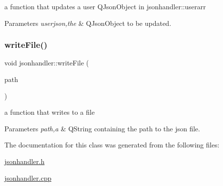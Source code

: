 a function that updates a user Q\+Json\+Object in jsonhandler\+::userarr 


\begin{DoxyParams}{Parameters}
{\em userjson,the} & Q\+Json\+Object to be updated. \\
\hline
\end{DoxyParams}
\mbox{\label{classjsonhandler_a1439109eb8fa7fffde057548afd8e3bb}} 
\subsubsection{\texorpdfstring{write\+File()}{writeFile()}}
{\footnotesize\ttfamily void jsonhandler\+::write\+File (\begin{DoxyParamCaption}\item[{Q\+String}]{path }\end{DoxyParamCaption})}



a function that writes to a file 


\begin{DoxyParams}{Parameters}
{\em path,a} & Q\+String containing the path to the json file. \\
\hline
\end{DoxyParams}


The documentation for this class was generated from the following files\+:\begin{DoxyCompactItemize}
\item 
\hyperlink{jsonhandler_8h}{jsonhandler.\+h}\item 
\hyperlink{jsonhandler_8cpp}{jsonhandler.\+cpp}\end{DoxyCompactItemize}
